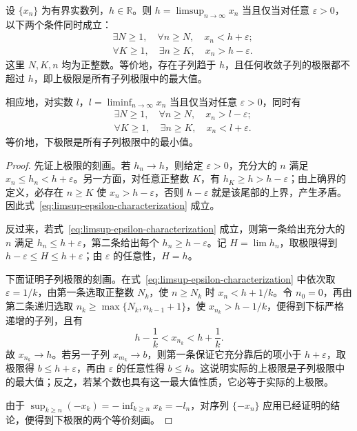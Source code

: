 \documentclass[UTF8,12pt,a4paper,fontset=fandol]{ctexbook}
\begin{document}
\begin{theorem}[上下极限的等价刻画]
\label{thm:liminf-limsup-characterizations}
设 $\{x_n\}$ 为有界实数列，$h\in\mathbb{R}$。则 $h=\limsup_{n\to\infty}x_n$ 当且仅当对任意 $\varepsilon>0$，以下两个条件同时成立：
\begin{equation}
    \begin{aligned}
        &\exists N\geq1,\quad\forall n\geq N,\quad x_n<h+\varepsilon;\\
        &\forall K\geq1,\quad\exists n\geq K,\quad x_n>h-\varepsilon.
    \end{aligned}
    \label{eq:limsup-epsilon-characterization}
\end{equation}
这里 $N,K,n$ 均为正整数。等价地，存在子列趋于 $h$，且任何收敛子列的极限都不超过 $h$，即上极限是所有子列极限中的最大值。

相应地，对实数 $l$，$l=\liminf_{n\to\infty}x_n$ 当且仅当对任意 $\varepsilon>0$，同时有
\begin{equation}
    \begin{aligned}
        &\exists N\geq1,\quad\forall n\geq N,\quad x_n>l-\varepsilon;\\
        &\forall K\geq1,\quad\exists n\geq K,\quad x_n<l+\varepsilon.
    \end{aligned}
    \label{eq:liminf-epsilon-characterization}
\end{equation}
等价地，下极限是所有子列极限中的最小值。
\end{theorem}

\begin{proof}
先证上极限的刻画。若 $h_n\to h$，则给定 $\varepsilon>0$，充分大的 $n$ 满足 $x_n\leq h_n<h+\varepsilon$。另一方面，对任意正整数 $K$，有 $h_K\geq h>h-\varepsilon$；由上确界的定义，必存在 $n\geq K$ 使 $x_n>h-\varepsilon$，否则 $h-\varepsilon$ 就是该尾部的上界，产生矛盾。因此式~\eqref{eq:limsup-epsilon-characterization} 成立。

反过来，若式~\eqref{eq:limsup-epsilon-characterization} 成立，则第一条给出充分大的 $n$ 满足 $h_n\leq h+\varepsilon$，第二条给出每个 $h_n\geq h-\varepsilon$。记 $H=\lim h_n$，取极限得到 $h-\varepsilon\leq H\leq h+\varepsilon$；由 $\varepsilon$ 的任意性，$H=h$。

下面证明子列极限的刻画。在式~\eqref{eq:limsup-epsilon-characterization} 中依次取 $\varepsilon=1/k$，由第一条选取正整数 $N_k$，使 $n\geq N_k$ 时 $x_n<h+1/k$。令 $n_0=0$，再由第二条递归选取 $n_k\geq\max\{N_k,n_{k-1}+1\}$，使 $x_{n_k}>h-1/k$，便得到下标严格递增的子列，且有
\[
    h-\frac1k<x_{n_k}<h+\frac1k.
\]
故 $x_{n_k}\to h$。若另一子列 $x_{m_k}\to b$，则第一条保证它充分靠后的项小于 $h+\varepsilon$，取极限得 $b\leq h+\varepsilon$，再由 $\varepsilon$ 的任意性得 $b\leq h$。这说明实际的上极限是子列极限中的最大值；反之，若某个数也具有这一最大值性质，它必等于实际的上极限。

由于 $\sup_{k\geq n}(-x_k)=-\inf_{k\geq n}x_k=-l_n$，对序列 $\{-x_n\}$ 应用已经证明的结论，便得到下极限的两个等价刻画。
\end{proof}
\end{document}
